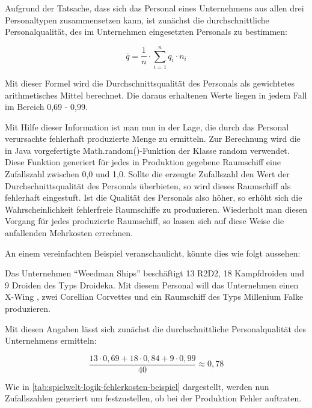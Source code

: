 Aufgrund der Tatsache, dass sich das Personal eines Unternehmens aus allen drei Personaltypen
zusammensetzen kann, ist zunächst die durchschnittliche Personalqualität, des im Unternehmen
eingesetzten Personals zu bestimmen:

\begin{equation}
     \overline{q} = \frac{1}{n} \cdot \sum\limits_{i=1}^n {q_i \cdot n_i}
     \label{alg:spielwelt-logik-fehlerkosten-1}
\end{equation}

Mit dieser Formel wird die Durchschnittsqualität des Personals als gewichtetes arithmetisches Mittel
berechnet. Die daraus erhaltenen Werte liegen in jedem Fall im Bereich 0,69 - 0,99.

Mit Hilfe dieser Information ist man nun in der Lage, die durch das Personal verursachte fehlerhaft
produzierte Menge zu ermitteln. Zur Berechnung wird die in Java vorgefertigte Math.random()-Funktion
der Klasse random verwendet. Diese Funktion generiert für jedes in Produktion gegebene Raumschiff eine
Zufallszahl zwischen 0,0 und 1,0. Sollte die erzeugte Zufallszahl den Wert der Durchschnittsqualität
des Personals überbieten, so wird dieses Raumschiff als fehlerhaft eingestuft. Ist die Qualität des
Personals also höher, so erhöht sich die Wahrscheinlichkeit fehlerfreie Raumschiffe zu produzieren.
Wiederholt man diesen Vorgang für jedes produzierte Raumschiff, so lassen sich auf diese Weise die
anfallenden Mehrkosten errechnen.

\bigskip

An einem vereinfachten Beispiel veranschaulicht, könnte dies wie folgt aussehen:

Das Unternehmen “Weedman Ships” beschäftigt 13 R2D2, 18 Kampfdroiden und 9 Droiden des Typs Droideka.
Mit diesem Personal will das Unternehmen einen X-Wing , zwei Corellian Corvettes und ein Raumschiff
des Typs Millenium Falke produzieren.

Mit diesen Angaben lässt sich zunächst die durchschnittliche Personalqualität des Unternehmens ermitteln:

\begin{equation}
     \frac{13 \cdot 0,69 + 18 \cdot 0,84 + 9 \cdot 0,99}{40} \approx 0,78 \nonumber
     \label{alg:spielwelt-logik-fehlerkosten-Beispiel}
\end{equation}

Wie in \ref{tab:spielwelt-logik-fehlerkosten-beispiel} dargestellt, werden nun Zufallszahlen generiert um
festzustellen, ob bei der Produktion Fehler auftraten.

